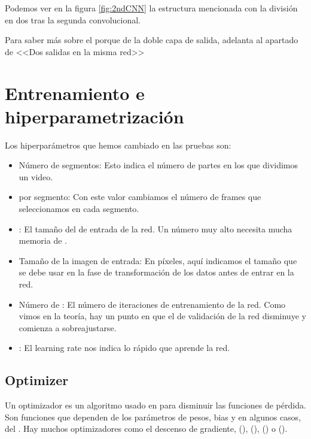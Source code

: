 Podemos ver en la figura \ref{fig:2ndCNN} la estructura mencionada con la división en dos tras la segunda convolucional.


Para saber más sobre el porque de la doble capa de salida, adelanta al apartado de <<Dos salidas en la misma red>>


\section{Entrenamiento e hiperparametrización}

Los hiperparámetros que hemos cambiado en las pruebas son:

\begin{itemize}
  \item Número de segmentos: Esto indica el número de partes en los que dividimos un video.

  \item {} por segmento: Con este valor cambiamos el número de frames que seleccionamos en cada segmento.

  \item {}: El tamaño del  de entrada de la red. Un número muy alto necesita mucha memoria de .

  \item Tamaño de la imagen de entrada: En píxeles, aquí indicamos el tamaño que se debe usar en la fase de transformación de los datos antes de entrar en la red.

  \item Número de : El número de iteraciones de entrenamiento de la red. Como vimos en la teoría, hay un punto en que el  de validación de la red disminuye y comienza a sobreajustarse.

  \item {}: El learning rate nos indica lo rápido que aprende la red.
\end{itemize}

\subsection{Optimizer}

Un optimizador es un algoritmo usado en  para disminuir las funciones de pérdida. Son funciones que dependen de los parámetros de pesos, bias y en algunos casos, del . Hay muchos optimizadores como el descenso de gradiente,  (),  (),  () o  ().

